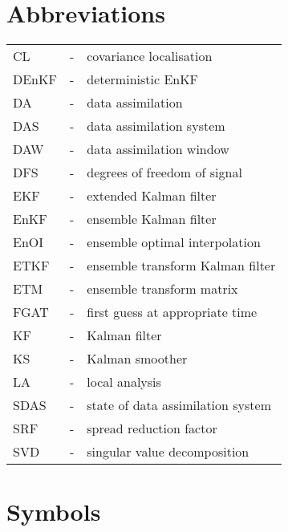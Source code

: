 \documentclass[11pt]{report}
\begin{document}
\clearpage

\nocite{eve94a}
\nocite{eve03a}
\nocite{hun04a}
\nocite{hun07a}
\nocite{sak08a}
\nocite{sak10a}
\nocite{sak11a}




\clearpage

\chapter*{Abbreviations}

\begin{tabular}{lll}
  CL &-& covariance localisation \\
  DEnKF &-& deterministic EnKF \\
  DA &-& data assimilation \\
  DAS &-& data assimilation system \\
  DAW &-& data assimilation window \\
  DFS &-& degrees of freedom of signal \\
  EKF &-& extended Kalman filter \\
  EnKF &-& ensemble Kalman filter \\
  EnOI &-& ensemble optimal interpolation \\
  ETKF &-& ensemble transform Kalman filter \\
  ETM &-& ensemble transform matrix \\
  FGAT &-& first guess at appropriate time \\
  KF &-& Kalman filter \\
  KS &-& Kalman smoother \\
  LA &-& local analysis \\
  SDAS &-& state of data assimilation system \\
  SRF &-& spread reduction factor \\
  SVD &-& singular value decomposition \\
\end{tabular}

\clearpage

\chapter*{Symbols}
\end{document}
